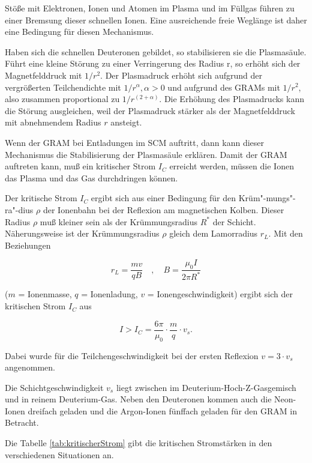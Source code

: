 Stöße mit Elektronen, Ionen und Atomen im Plasma und im Füllgas führen
zu einer Bremsung dieser schnellen Ionen. Eine ausreichende freie
Weglänge ist daher eine Bedingung für diesen Mechanismus.
\par
Haben sich die schnellen Deuteronen gebildet, so stabilisieren sie die
Plasmasäule. Führt eine kleine Störung zu einer Verringerung des Radius
r, so erhöht sich der Magnetfelddruck mit $1/r^2$. Der Plasmadruck
erhöht sich aufgrund der vergrößerten Teilchendichte mit $1/r^\alpha,
\alpha > 0$ und aufgrund des GRAMs mit $1/r^2$, also zusammen
proportional zu $1/r^{(2+\alpha)}$. Die Erhöhung des Plasmadrucks kann
die Störung ausgleichen, weil der Plasmadruck stärker als der
Magnetfelddruck mit abnehmendem Radius $r$ ansteigt.
\par
Wenn der GRAM bei Entladungen im SCM auftritt, dann kann dieser
Mechanismus die Stabilisierung der Plasmasäule erklären. Damit der GRAM
auftreten kann, muß ein kritischer Strom $I_C$ erreicht werden, müssen
die Ionen das Plasma und das Gas durchdringen können.
\par
Der kritische Strom $I_C$ ergibt sich aus einer Bedingung für den
Krüm"-mungs"-ra"-dius $\rho$ der Ionenbahn bei der Reflexion am
magnetischen Kolben. Dieser Radius $\rho$ muß kleiner sein als der
Krümmungsradius $R^\ast$ der Schicht. Näherungsweise ist der
Krümmungsradius $\rho$ gleich dem Lamorradius $r_L$. Mit den
Beziehungen
\par
$$ r_L = \frac{mv}{qB} \quad,\quad B = \frac{\mu_0 I}{2 \pi R^\ast} $$
\par
($m$ = Ionenmasse, $q$ = Ionenladung, $v$ = Ionengeschwindigkeit)
ergibt sich der kritischen Strom $I_C$ aus
\par
$$ I > I_C = \frac{6\pi}{\mu_0} \cdot \frac{m}{q} \cdot v_s .$$
\par
Dabei wurde für die Teilchengeschwindigkeit bei der ersten Reflexion $v
= 3 \cdot v_s$ angenommen.
\par
Die Schichtgeschwindigkeit $v_s$ liegt zwischen 
im Deuterium-Hoch-Z-Gasgemisch und  in reinem
Deuterium-Gas. Neben den Deuteronen kommen auch die Neon-Ionen
dreifach geladen und die Argon-Ionen fünffach geladen für den GRAM
in Betracht.
\par
Die Tabelle \vref{tab:kritischerStrom} gibt die kritischen
Stromstärken in den verschiedenen Situationen an.
%
\par
